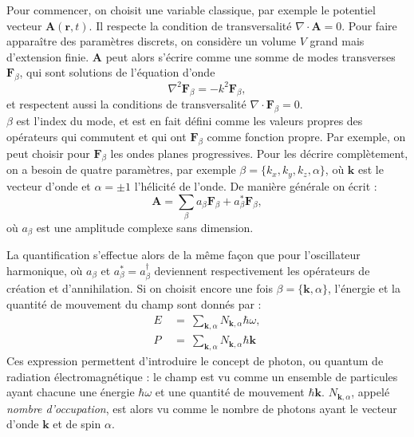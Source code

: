 Pour commencer, on choisit une variable classique, par exemple le potentiel vecteur $\bm{A}(\bm{r},t)$. Il respecte la condition de transversalité $\nabla\cdot\bm{A}=0$. Pour faire apparaître des paramètres discrets, on considère un volume $V$ grand mais d'extension finie. $\bm{A}$ peut alors s'écrire comme une somme de modes transverses $\bm{F}_\beta$, qui sont solutions de l'équation d'onde
\begin{equation*}
\nabla^2\bm{F}_\beta=-k^2\bm{F}_\beta,
\end{equation*}
et respectent aussi la conditions de transversalité $\nabla\cdot\bm{F}_\beta=0$.\\
$\beta$ est l'index du mode, et est en fait défini comme les valeurs propres des opérateurs qui commutent et qui ont $\bm{F}_\beta$ comme fonction propre. Par exemple, on peut choisir pour $\bm{F}_\beta$ les ondes planes progressives. Pour les décrire complètement, on a besoin de quatre paramètres, par exemple $\beta = \{k_x, k_y, k_z, \alpha\}$, où $\bm{k}$ est le vecteur d'onde et $\alpha=\pm1$ l'hélicité de l'onde. De manière générale on écrit :
\begin{equation}
\bm{A}=\sum_{\beta}{a_{\beta}\bm{F}_\beta+a^*_{\beta}\bm{F}_\beta},
\label{A_decomp_Flambda}
\end{equation}
où $a_{\beta}$ est une amplitude complexe sans dimension. 

La quantification s'effectue alors de la même façon que pour l'oscillateur harmonique, où $a_{\beta}$ et $a^*_{\beta} = a^{\dag}_{\beta}$ deviennent respectivement les opérateurs de création et d'annihilation. Si on choisit encore une fois $\beta = \{\bm{k}, \alpha\}$, l'énergie et la quantité de mouvement du champ sont donnés par :
\begin{align*}
E~&=~\sum_{\bm{k},\alpha}{N_{\bm{k},\alpha} \hbar\omega}, \\
P~&=~\sum_{\bm{k},\alpha}{N_{\bm{k},\alpha} \hbar\bm{k}}
\end{align*}
Ces expression permettent d'introduire le concept de photon, ou quantum de radiation électromagnétique : le champ est vu comme un ensemble de particules ayant chacune une énergie $\hbar\omega$ et une quantité de mouvement $\hbar\bm{k}$. $N_{\bm{k},\alpha}$, appelé \textit{nombre d'occupation}, est alors vu comme le nombre de photons ayant le vecteur d'onde $\bm{k}$ et de spin $\alpha$.

